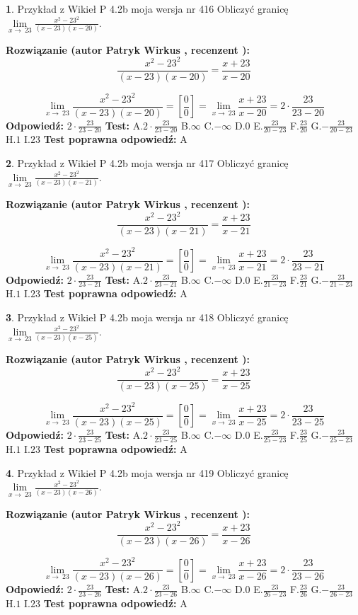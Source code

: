 \documentclass[12pt, a4paper]{article}
\theoremstyle{definition} %
\newtheorem{zad}{}
\newcommand{\zadStart}[1]{\begin{zad}#1\newline}
\newcommand{\zadStop}{\end{zad}}
\newcommand{\rozwStart}[2]{\noindent \textbf{Rozwiązanie (autor #1 , recenzent #2): }\newline}
\newcommand{\rozwStop}{\newline}
\newcommand{\odpStart}{\noindent \textbf{Odpowiedź:}\newline}
\newcommand{\odpStop}{\newline}
\newcommand{\testStart}{\noindent \textbf{Test:}\newline}
\newcommand{\testStop}{\newline}
\newcommand{\kluczStart}{\noindent \textbf{Test poprawna odpowiedź:}\newline}
\newcommand{\kluczStop}{\newline}
\begin{document}
\zadStart{Przykład z Wikieł P 4.2b moja wersja nr 416}
Obliczyć granicę $\lim\limits_{x\to\ 23}\frac{x^{2}-23^{2}}{(x-23)(x-20)}$.
\zadStop
\rozwStart{Patryk Wirkus}{}
$$\frac{x^{2}-23^{2}}{(x-23)(x-20)}=\frac{x+23}{x-20}$$

$$\lim\limits_{x\to\ 23}\frac{x^{2}-23^{2}}{(x-23)(x-20)}=[\frac{0}{0}]=\lim\limits_{x\to\ 23}\frac{x+23}{x-20}=2 \cdot \frac{23}{23-20}$$
\rozwStop
\odpStart
$2 \cdot \frac{23}{23-20}$
\odpStop
\testStart
A.$2 \cdot \frac{23}{23-20}$
B.$\infty$
C.$-\infty$
D.$0$
E.$\frac{23}{20-23}$
F.$\frac{23}{20}$
G.$-\frac{23}{20-23}$
H.$1$
I.$23$
\testStop
\kluczStart
A
\kluczStop



\zadStart{Przykład z Wikieł P 4.2b moja wersja nr 417}
Obliczyć granicę $\lim\limits_{x\to\ 23}\frac{x^{2}-23^{2}}{(x-23)(x-21)}$.
\zadStop
\rozwStart{Patryk Wirkus}{}
$$\frac{x^{2}-23^{2}}{(x-23)(x-21)}=\frac{x+23}{x-21}$$

$$\lim\limits_{x\to\ 23}\frac{x^{2}-23^{2}}{(x-23)(x-21)}=[\frac{0}{0}]=\lim\limits_{x\to\ 23}\frac{x+23}{x-21}=2 \cdot \frac{23}{23-21}$$
\rozwStop
\odpStart
$2 \cdot \frac{23}{23-21}$
\odpStop
\testStart
A.$2 \cdot \frac{23}{23-21}$
B.$\infty$
C.$-\infty$
D.$0$
E.$\frac{23}{21-23}$
F.$\frac{23}{21}$
G.$-\frac{23}{21-23}$
H.$1$
I.$23$
\testStop
\kluczStart
A
\kluczStop



\zadStart{Przykład z Wikieł P 4.2b moja wersja nr 418}
Obliczyć granicę $\lim\limits_{x\to\ 23}\frac{x^{2}-23^{2}}{(x-23)(x-25)}$.
\zadStop
\rozwStart{Patryk Wirkus}{}
$$\frac{x^{2}-23^{2}}{(x-23)(x-25)}=\frac{x+23}{x-25}$$

$$\lim\limits_{x\to\ 23}\frac{x^{2}-23^{2}}{(x-23)(x-25)}=[\frac{0}{0}]=\lim\limits_{x\to\ 23}\frac{x+23}{x-25}=2 \cdot \frac{23}{23-25}$$
\rozwStop
\odpStart
$2 \cdot \frac{23}{23-25}$
\odpStop
\testStart
A.$2 \cdot \frac{23}{23-25}$
B.$\infty$
C.$-\infty$
D.$0$
E.$\frac{23}{25-23}$
F.$\frac{23}{25}$
G.$-\frac{23}{25-23}$
H.$1$
I.$23$
\testStop
\kluczStart
A
\kluczStop



\zadStart{Przykład z Wikieł P 4.2b moja wersja nr 419}
Obliczyć granicę $\lim\limits_{x\to\ 23}\frac{x^{2}-23^{2}}{(x-23)(x-26)}$.
\zadStop
\rozwStart{Patryk Wirkus}{}
$$\frac{x^{2}-23^{2}}{(x-23)(x-26)}=\frac{x+23}{x-26}$$

$$\lim\limits_{x\to\ 23}\frac{x^{2}-23^{2}}{(x-23)(x-26)}=[\frac{0}{0}]=\lim\limits_{x\to\ 23}\frac{x+23}{x-26}=2 \cdot \frac{23}{23-26}$$
\rozwStop
\odpStart
$2 \cdot \frac{23}{23-26}$
\odpStop
\testStart
A.$2 \cdot \frac{23}{23-26}$
B.$\infty$
C.$-\infty$
D.$0$
E.$\frac{23}{26-23}$
F.$\frac{23}{26}$
G.$-\frac{23}{26-23}$
H.$1$
I.$23$
\testStop
\kluczStart
A
\kluczStop
\end{document}
